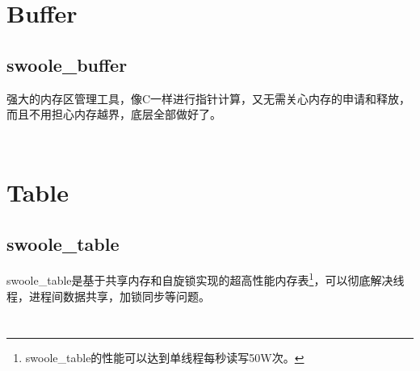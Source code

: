 \begin{lstlisting}[language=bash]

\end{lstlisting}

\chapter{Buffer}



\section{swoole\_buffer}

强大的内存区管理工具，像C一样进行指针计算，又无需关心内存的申请和释放，而且不用担心内存越界，底层全部做好了。

\begin{lstlisting}[language=bash]

\end{lstlisting}




\begin{lstlisting}[language=bash]

\end{lstlisting}






\chapter{Table}



\section{swoole\_table}


swoole\_table是基于共享内存和自旋锁实现的超高性能内存表\footnote{swoole\_table的性能可以达到单线程每秒读写50W次。}，可以彻底解决线程，进程间数据共享，加锁同步等问题。




\begin{lstlisting}[language=bash]

\end{lstlisting}





\begin{lstlisting}[language=bash]

\end{lstlisting}





